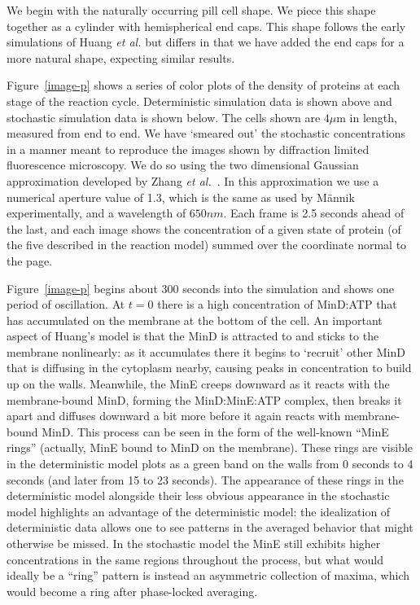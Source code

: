 \documentclass[10pt,letterpaper]{article}
\newcommand\micron{\ensuremath{\mu\text{m}}}
\begin{document}
We begin with the naturally occurring pill cell shape.  We piece this
shape together as a cylinder with hemispherical end caps.  This shape
follows the early simulations of Huang \emph{et al.} but differs in
that we have added the end caps for a more natural shape, expecting
similar results.

Figure~\ref{image-p} shows a series of color plots of the density of
proteins at each stage of the reaction cycle. Deterministic simulation
data is shown above and stochastic simulation data is shown below.
The cells shown are $4\micron$ in length, measured from end to end.
We have `smeared out' the stochastic concentrations in a manner meant
to reproduce the images shown by diffraction limited fluorescence
microscopy.  We do so using the two dimensional Gaussian approximation
developed by Zhang \emph{et al.}~\cite{zhang2007gaussian}.  In this
approximation we use a numerical aperture value of 1.3, which is the
same as used by M\"annik experimentally, and a wavelength of $650nm$.
Each frame is 2.5 seconds ahead of the last, and each image shows the
concentration of a given state of protein (of the five described in
the reaction model) summed over the coordinate normal to the page.

Figure~\ref{image-p} begins about 300 seconds into the simulation and
shows one period of oscillation.  At $t=0$ there is a high
concentration of MinD:ATP that has accumulated on the membrane at the
bottom of the cell. An important aspect of Huang's model is that the
MinD is attracted to and sticks to the membrane nonlinearly: as it
accumulates there it begins to `recruit' other MinD that is diffusing
in the cytoplasm nearby, causing peaks in concentration to build up on
the walls.  Meanwhile, the MinE creeps downward as it reacts with the
membrane-bound MinD, forming the MinD:MinE:ATP complex, then breaks it
apart and diffuses downward a bit more before it again reacts with
membrane-bound MinD.  This process can be seen in the form of the
well-known ``MinE rings'' (actually, MinE bound to MinD on the
membrane).  These rings are visible in the deterministic model plots
as a green band on the walls from 0 seconds to 4 seconds (and later
from 15 to 23 seconds).  The appearance of these rings in the
deterministic model alongside their less obvious appearance in the
stochastic model highlights an advantage of the deterministic model:
the idealization of deterministic data allows one to see patterns in
the averaged behavior that might otherwise be missed.  In the
stochastic model the MinE still exhibits higher concentrations in the
same regions throughout the process, but what would ideally be a
``ring'' pattern is instead an asymmetric collection of maxima, which
would become a ring after phase-locked averaging.
\end{document}
